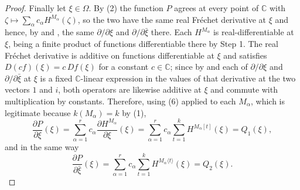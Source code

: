 \begin{proof}
Finally let $\xi\in\Omega$.  By (2) the function $P$ agrees at every point of
$\mathbb{C}$ with $\zeta\mapsto\sum_{\alpha}c_\alpha H^{M_\alpha}(\zeta)$, so
the two have the same real Fr\'echet derivative at $\xi$ and hence, by
 and , the same $\partial/\partial\xi$ and
$\partial/\partial\bar\xi$ there.  Each $H^{M_\alpha}$ is real-differentiable
at $\xi$, being a finite product of functions differentiable there by Step 1.
The real Fr\'echet derivative is additive on functions differentiable at $\xi$
and satisfies $D(cf)(\xi)=c\,Df(\xi)$ for a constant $c\in\mathbb{C}$; since
by  and  each of $\partial/\partial\xi$ and
$\partial/\partial\bar\xi$ at $\xi$ is a fixed $\mathbb{C}$-linear expression
in the values of that derivative at the two vectors $1$ and $i$, both
operators are likewise additive at $\xi$ and commute with multiplication by
constants.  Therefore, using (6) applied to each $M_\alpha$, which is
legitimate because $k(M_\alpha)=k$ by (1),
\[
  \frac{\partial P}{\partial\xi}(\xi)
  =\sum_{\alpha=1}^{r}c_\alpha\frac{\partial H^{M_\alpha}}{\partial\xi}(\xi)
  =\sum_{\alpha=1}^{r}c_\alpha\sum_{t=1}^{k}H^{M_\alpha[t]}(\xi)
  =Q_1(\xi),
\]
and in the same way
\[
  \frac{\partial P}{\partial\bar\xi}(\xi)
  =\sum_{\alpha=1}^{r}c_\alpha\sum_{t=1}^{k}H^{M_\alpha\langle t\rangle}(\xi)
  =Q_2(\xi).
\]
\end{proof}
